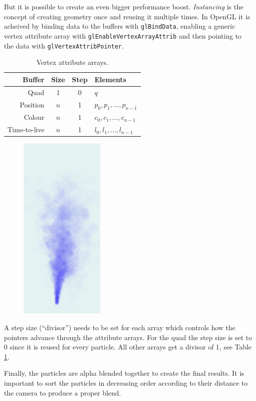 \documentclass[a4paper, twocolumn, DIV=15]{scrartcl}
\begin{document}
But it is possible to create an even bigger performance boost.
\emph{Instancing} is the concept of creating geometry once and reusing
it multiple times. In OpenGL it is acheived by binding data to the
buffers with \texttt{glBindData}, enabling a generic vertex attribute
array with \texttt{glEnableVertexArrayAttrib} and then pointing to the
data with \texttt{glVertexAttribPointer}.
\begin{table}[!h]
  \centering
  \begin{tabular}{r c c l}
    Buffer & Size & Step & Elements \\
    \hline
    Quad & 1 & 0 & $q$ \\
    Position & $n$ & 1 & $p_{0},p_{1},\dots,p_{n-1}$ \\
    Colour & $n$ & 1 & $c_{0},c_{1},\dots,c_{n-1}$ \\
    Time-to-live & $n$ & 1 & $l_{0},l_{1},\dots,l_{n-1}$ \\
  \end{tabular}
  \caption{Vertex attribute arrays.}
  \label{tab:buffers}
\end{table}

\begin{figure}
  \includegraphics[width=0.2\columnwidth]{smoke}
\end{figure}
A step size (``divisor'') needs to be set for each array which
controls how the pointers advance through the attribute arrays. For
the quad the step size is set to 0 since it is reused for every
particle. All other arrays get a divisor of 1, see Table
\ref{tab:buffers}.

Finally, the particles are alpha blended together to create the final
results. It is important to sort the particles in decreasing order
according to their distance to the camera to produce a proper blend.

\printbibliography
\end{document}

